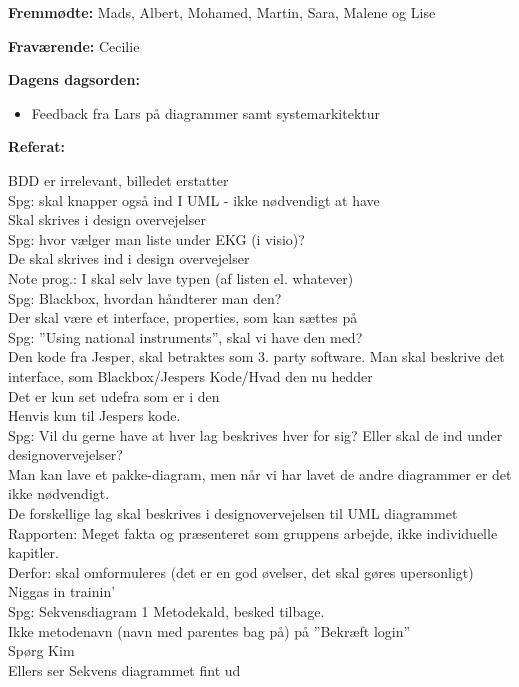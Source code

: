 \textbf{Fremmødte:} Mads, Albert, Mohamed, Martin, Sara, Malene og Lise

\textbf{Fraværende:} Cecilie

\textbf{Dagens dagsorden:}
\begin{itemize}
	\item Feedback fra Lars på diagrammer samt systemarkitektur
\end{itemize}

\textbf{Referat:}

BDD er irrelevant, billedet erstatter
\\ 
Spg: skal knapper også ind I UML - ikke nødvendigt at have \\
	Skal skrives i design overvejelser
\\

Spg: hvor vælger man liste under EKG (i visio)?\\
	De skal skrives ind i design overvejelser
\\
Note prog.: I skal selv lave typen (af listen el. whatever)
\\
Spg: Blackbox, hvordan håndterer man den?\\
	Der skal være et interface, properties, som kan sættes på
\\
Spg: ”Using national instruments”, skal vi have den med?\\
	Den kode fra Jesper, skal betraktes som 3. party software.
	Man skal beskrive det interface, som Blackbox/Jespers Kode/Hvad den nu hedder\\
	Det er kun set udefra som er i den\\
	Henvis kun til Jespers kode.
\\
Spg: Vil du gerne have at hver lag beskrives hver for sig? Eller skal de ind under designovervejelser?\\
Man kan lave et pakke-diagram, men når vi har lavet de andre diagrammer er det ikke nødvendigt.\\
De forskellige lag skal beskrives i designovervejelsen til UML diagrammet
\\
Rapporten: Meget fakta og præsenteret som gruppens arbejde, ikke individuelle kapitler.\\
	Derfor: skal omformuleres (det er en god øvelser, det skal gøres upersonligt)
	Niggas in trainin’
\\
Spg: Sekvensdiagram 1
	Metodekald, besked tilbage.	\\
Ikke metodenavn (navn med parentes bag på) på ”Bekræft login”\\
Spørg Kim\\
Ellers ser Sekvens diagrammet fint ud
\\

